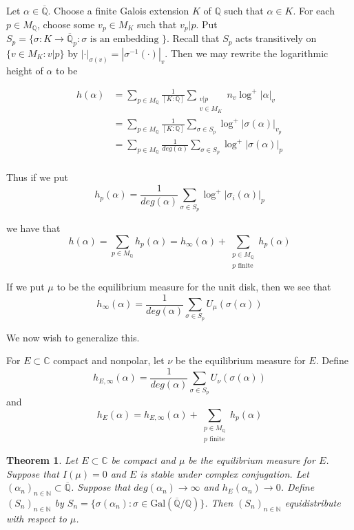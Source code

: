 \documentclass{amsart}
\newtheorem{thm}{Theorem}[section]
\newcommand{\sbs}{\subset}
\newcommand{\N}{\mathbb{N}}
\newcommand{\C}{\mathbb{C}}
\newcommand{\Q}{\mathbb{Q}}
\newcommand{\ol}{\overline}
\begin{document}
Let $\alpha \in \ol{\Q}$. Choose a finite Galois extension $K$ of $\Q$ such that $\alpha \in K$. For each $p \in M_{\Q}$, choose some $v_p \in M_K$ such that $v_p|p$. Put $S_p = \{\sigma :K \rightarrow \ol{\Q}_p: \sigma \text{ is an embedding }\}$. Recall that $S_p$ acts transitively on $\{v \in M_K: v|p\}$ by $|\cdot|_{\sigma(v)} = |\sigma^{-1}( \cdot)|_v$. Then we may rewrite the logarithmic height of $\alpha$ to be 

\begin{align*}
h(\alpha)
&= \sum_{p \in M_{\Q}} \frac{1}{[K:\Q]} \sum_{\substack{v|p\\v \in M_K}}n_v \log^+|\alpha|_v\\
&= \sum_{p \in M_{\Q}} \frac{1}{[K:\Q]} \sum_{\sigma \in S_p} \log^+ |\sigma(\alpha)|_{v_p}\\
&= \sum_{p \in M_{\Q}} \frac{1}{deg(\alpha)}\sum_{\sigma \in S_p} \log^+ |\sigma(\alpha)|_{p}\\
\end{align*}

Thus if we put $$h_p(\alpha) = \frac{1}{deg(\alpha)}\sum_{\sigma \in S_p} \log^+ |\sigma_i(\alpha)|_{p}$$ 

we have that $$h(\alpha) = \sum_{p \in M_{\Q}} h_p(\alpha) = h_{\infty}(\alpha) + \sum_{\substack{p \in M_{\Q}\\ p \text{ finite}}} h_p(\alpha)$$

If we put $\mu$ to be the equilibrium measure for the unit disk, then we see that $$h_{\infty}(\alpha) = \frac{1}{deg(\alpha)} \sum_{\sigma \in S_p} U_{\mu}(\sigma(\alpha))$$

We now wish to generalize this.

For $E \sbs \C$ compact and nonpolar, let $\nu$ be the equilibrium measure for $E$. Define $$h_{E,\infty}(\alpha) = \frac{1}{deg(\alpha)} \sum_{\sigma \in S_p} U_{\nu}(\sigma(\alpha))$$ and $$h_E(\alpha) = h_{E,\infty}(\alpha) + \sum_{\substack{p \in M_{\Q}\\ p \text{ finite}}} h_p(\alpha)$$

\begin{thm}

Let $E \sbs \C $ be compact and $\mu$ be the equilibrium measure for $E$. Suppose that $I(\mu) = 0$ and $E$ is stable under complex conjugation. Let $(\alpha_n)_{n \in \N} \sbs \ol{\Q}$. Suppose that $deg(\alpha_n) \rightarrow \infty$ and $h_E(\alpha_n) \rightarrow 0$. Define $(S_n)_{n \in \N}$ by $S_n = \{\sigma(\alpha_n): \sigma \in \mathrm{Gal}(\ol{ \Q }/ \Q )\}$. Then $(S_n)_{n \in \N}$ equidistribute with respect to $\mu$. 

\end{thm}
\end{document}

